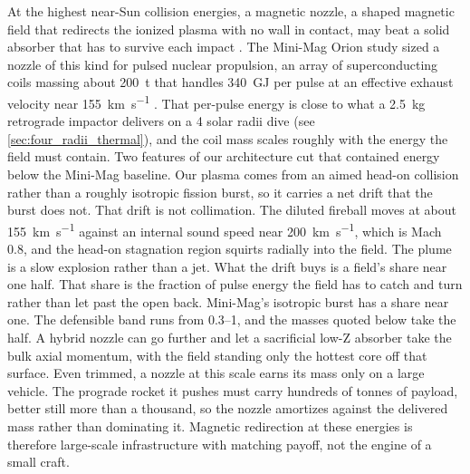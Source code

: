 \documentclass{article}
\begin{document}
At the highest near-Sun collision energies, a magnetic nozzle, a shaped magnetic field that redirects the ionized plasma with no wall in contact, may beat a solid absorber that has to survive each impact \cite{ahedo2010magnetic}. The Mini-Mag Orion study sized a nozzle of this kind for pulsed nuclear propulsion, an array of superconducting coils massing about \SI{200}{\tonne} that handles \SI{340}{\giga\joule} per pulse at an effective exhaust velocity near \SI{155}{\kilo\meter\per\second} \cite{ewig2003minimag, lenard2007minimag}. That per-pulse energy is close to what a \SI{2.5}{\kilo\gram} retrograde impactor delivers on a 4 solar radii dive (see \autoref{sec:four_radii_thermal}), and the coil mass scales roughly with the energy the field must contain. Two features of our architecture cut that contained energy below the Mini-Mag baseline. Our plasma comes from an aimed head-on collision rather than a roughly isotropic fission burst, so it carries a net drift that the burst does not. That drift is not collimation. The diluted fireball moves at about \SI{155}{\kilo\meter\per\second} against an internal sound speed near \SI{200}{\kilo\meter\per\second}, which is Mach \num{0.8}, and the head-on stagnation region squirts radially into the field. The plume is a slow explosion rather than a jet. What the drift buys is a field's share near one half. That share is the fraction of pulse energy the field has to catch and turn rather than let past the open back. Mini-Mag's isotropic burst has a share near one. The defensible band runs from \numrange{0.3}{1}, and the masses quoted below take the half. A hybrid nozzle can go further and let a sacrificial low-Z absorber take the bulk axial momentum, with the field standing only the hottest core off that surface. Even trimmed, a nozzle at this scale earns its mass only on a large vehicle. The prograde rocket it pushes must carry hundreds of tonnes of payload, better still more than a thousand, so the nozzle amortizes against the delivered mass rather than dominating it. Magnetic redirection at these energies is therefore large-scale infrastructure with matching payoff, not the engine of a small craft.
\end{document}
